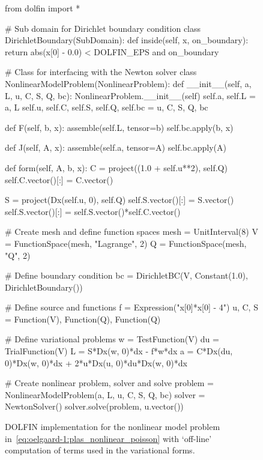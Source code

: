 \begin{figure}
\begin{python}
from dolfin import *

# Sub domain for Dirichlet boundary condition
class DirichletBoundary(SubDomain):
    def inside(self, x, on_boundary):
        return abs(x[0] - 0.0) < DOLFIN_EPS and on_boundary

# Class for interfacing with the Newton solver
class NonlinearModelProblem(NonlinearProblem):
    def __init__(self, a, L, u, C, S, Q, bc):
        NonlinearProblem.__init__(self)
        self.a, self.L = a, L
        self.u, self.C, self.S, self.Q, self.bc = u, C, S, Q, bc

    def F(self, b, x):
        assemble(self.L, tensor=b)
        self.bc.apply(b, x)

    def J(self, A, x):
        assemble(self.a, tensor=A)
        self.bc.apply(A)

    def form(self, A, b, x):
        C = project((1.0 + self.u**2), self.Q)
        self.C.vector()[:] = C.vector()

        S = project(Dx(self.u, 0), self.Q)
        self.S.vector()[:] = S.vector()
        self.S.vector()[:] = self.S.vector()*self.C.vector()

# Create mesh and define function spaces
mesh = UnitInterval(8)
V = FunctionSpace(mesh, "Lagrange", 2)
Q = FunctionSpace(mesh, "Q", 2)

# Define boundary condition
bc = DirichletBC(V, Constant(1.0), DirichletBoundary())

# Define source and functions
f = Expression("x[0]*x[0] - 4")
u, C, S = Function(V), Function(Q), Function(Q)

# Define variational problems
w  = TestFunction(V)
du = TrialFunction(V)
L  = S*Dx(w, 0)*dx - f*w*dx
a  = C*Dx(du, 0)*Dx(w, 0)*dx + 2*u*Dx(u, 0)*du*Dx(w, 0)*dx

# Create nonlinear problem, solver and solve
problem = NonlinearModelProblem(a, L, u, C, S, Q, bc)
solver  = NewtonSolver()
solver.solve(problem, u.vector())
\end{python}
\caption{DOLFIN implementation for the nonlinear model problem
in~\eqref{eq:oelgaard-1:plas_nonlinear_poisson} with `off-line'
computation of terms used in the variational forms.}
\label{fig:oelgaard-1:plas_nonlinear_poisson_code}
\end{figure}


